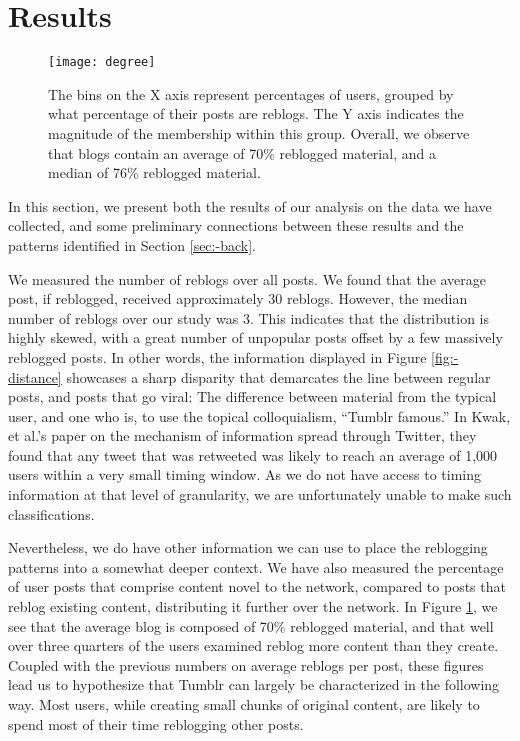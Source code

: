 \section{Results}
\label{sec:-res}


\begin{figure}[bht]
\centering
 \texttt{[image: degree]}
  \caption{The bins on the X axis represent percentages of users, grouped by what percentage of their posts are reblogs.  The Y axis indicates the magnitude of the membership within this group.  Overall, we observe that blogs contain an average of 70\% reblogged material, and a median of 76\% reblogged material.}
  \label{fig:-deg}
\end{figure}


In this section, we present both the results of our analysis on the 
data we have collected, and some preliminary connections between these 
results and the patterns identified in Section \ref{sec:-back}.


We measured the number of reblogs over all posts.  We found that the 
average post, if reblogged, received approximately 30 reblogs.  However, 
the median number of reblogs over our study was 3.  This indicates that 
the distribution is highly skewed, with a great number of unpopular posts 
offset by a few massively reblogged posts.  In other words, the 
information displayed in Figure \ref{fig:-distance} showcases a 
sharp disparity that demarcates the line between regular posts, and 
posts that go viral: The difference between material from the typical 
user, and one who is, to use the topical colloquialism, 
``Tumblr famous.''  In Kwak, et al.'s paper\cite{kwak2010twitter} on 
the mechanism of information spread through Twitter, they found that 
any tweet that was retweeted was likely to reach an average of 1,000 
users within a very small timing window.  As we do not have access to 
timing information at that level of granularity, we are unfortunately 
unable to make such classifications.


Nevertheless, we do have other information we can use to place the 
reblogging patterns into a somewhat deeper context.  We have also 
measured the percentage of user posts that comprise content novel to the 
network, compared to posts that reblog existing content, distributing 
it further over the network.  In Figure \ref{fig:-deg}, we see that 
the average blog is composed of 70\% reblogged material, and that well 
over three quarters of the users examined reblog more content than they 
create.  Coupled with the previous numbers on average reblogs per post, 
these figures lead us to hypothesize that Tumblr can largely be 
characterized in the following way.  Most users, while creating small 
chunks of original content, are likely to spend most of their time 
reblogging other posts.  


